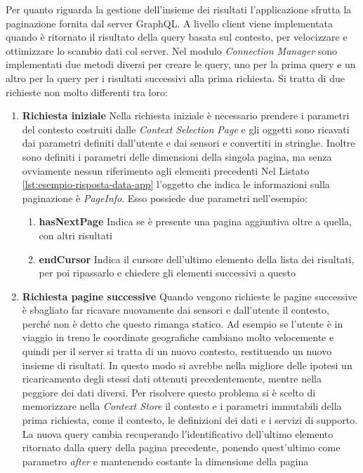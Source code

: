 Per quanto riguarda la gestione dell'insieme dei risultati l'applicazione sfrutta la paginazione fornita dal server GraphQL. A livello client viene implementata quando è ritornato il risultato della query basata sul contesto, per velocizzare e ottimizzare lo scambio dati col server. Nel modulo \emph{Connection Manager} sono implementati due metodi diversi per creare le query, uno per la prima query e un altro per la query per i risultati successivi alla prima richiesta. Si tratta di due richieste non molto differenti tra loro:
\begin{enumerate}
	\item \textbf{Richiesta iniziale} Nella richiesta iniziale è necessario prendere i parametri del contesto costruiti dalle \emph{Context Selection Page} e gli oggetti sono ricavati dai parametri definiti dall'utente e dai sensori e convertiti in stringhe. Inoltre sono definiti i parametri delle dimensioni della singola pagina, ma senza ovviamente nessun riferimento agli elementi precedenti
	Nel Listato \ref{lst:esempio-risposta-data-app} l'oggetto che indica le informazioni sulla paginazione è \emph{PageInfo}. Esso possiede due parametri nell'esempio:
	\begin{enumerate}
		\item \textbf{hasNextPage} Indica se è presente una pagina aggiuntiva oltre a quella, con altri risultati
		\item \textbf{endCursor} Indica il cursore dell'ultimo elemento della lista dei risultati, per poi ripassarlo e chiedere gli elementi successivi a questo
	\end{enumerate}
	\item \textbf{Richiesta pagine successive} Quando vengono richieste le pagine successive è sbagliato far ricavare nuovamente dai sensori e dall'utente il contesto, perché non è detto che questo rimanga statico. Ad esempio se l'utente è in viaggio in treno le coordinate geografiche cambiano molto velocemente e quindi per il server si tratta di un nuovo contesto, restituendo un nuovo insieme di risultati. In questo modo si avrebbe nella migliore delle ipotesi un ricaricamento degli stessi dati ottenuti precedentemente, mentre nella peggiore dei dati diversi. Per risolvere questo problema si è scelto di memorizzare nella \emph{Context Store} il contesto e i parametri immutabili della prima richiesta, come il contesto, le definizioni dei dati e i servizi di supporto. La nuova query cambia recuperando l'identificativo dell'ultimo elemento ritornato dalla query della pagina precedente, ponendo quest'ultimo come parametro \emph{after} e mantenendo costante la dimensione della pagina
\end{enumerate} 

